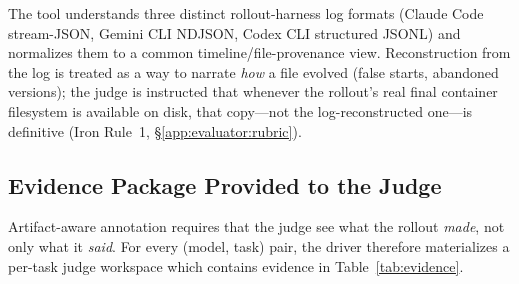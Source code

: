 The tool understands three distinct rollout-harness log formats (Claude
Code stream-JSON, Gemini CLI NDJSON, Codex CLI structured JSONL) and
normalizes them to a common timeline/file-provenance view. Reconstruction
from the log is treated as a way to narrate \emph{how} a file evolved
(false starts, abandoned versions); the judge is instructed that whenever
the rollout's real final container filesystem is available on disk, that
copy---not the log-reconstructed one---is definitive (Iron Rule~1,
\S\ref{app:evaluator:rubric}).

\subsection{Evidence Package Provided to the Judge}
\label{app:evaluator:evidence}

Artifact-aware annotation requires that the judge see what the rollout
\emph{made}, not only what it \emph{said}. For every (model, task) pair,
the driver therefore materializes a per-task judge workspace which contains evidence in Table~\ref{tab:evidence}.

